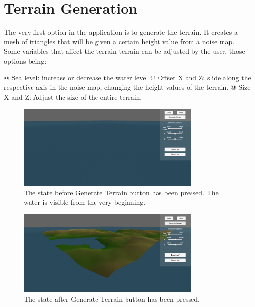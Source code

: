 \section{Terrain Generation}

The very first option in the application is to generate the terrain. It creates a mesh of triangles that will be given a certain height value from a noise map. Some variables that affect the terrain terrain can be adjusted by the user, those options being:

\begin{easylist}
 @ Sea level: increase or decrease the water level
 @ Offset X and Z: slide along the respective axis in the noise map, changing the height values of the terrain.
 @ Size X and Z: Adjust the size of the entire terrain.
\end{easylist}


\begin{figure}[h!]
  \centering

  \includegraphics[width=0.8\textwidth]{figure/terrain_not_generated.png}
  \caption{The state before Generate Terrain button has been pressed. The water is visible from the very beginning.}

  \label{fig:no_terr}
\end{figure}

\begin{figure}[h!]
  \centering

  \includegraphics[width=0.8\textwidth]{figure/terrain_generated.png}
  \caption{The state after Generate Terrain button has been pressed.}

  \label{fig:terr}
\end{figure}